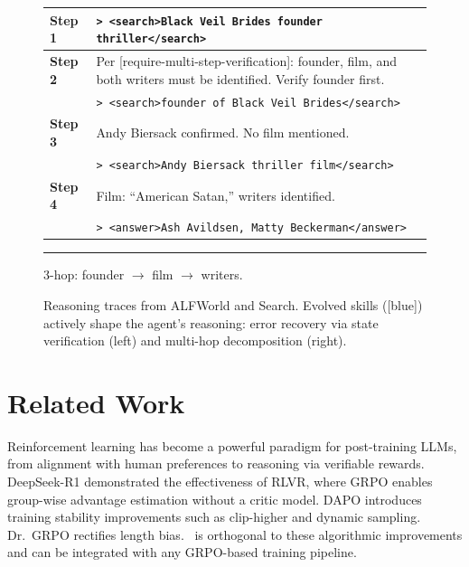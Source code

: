 \documentclass{article}
\theoremstyle{plain}
\theoremstyle{definition}
\theoremstyle{remark}
\begin{document}
\begin{figure}[!t]
\begin{minipage}[t]{0.55\textwidth}
\begin{tcolorbox}
\begin{tabularx}{\linewidth}{@{}p{0.7cm} X@{}}
    \textbf{Step 1} & \textcolor{black!55}{\texttt{> <search>Black Veil Brides founder thriller</search>}} \\
    \midrule
    \textbf{Step 2} & Per [\textcolor{skillcolor}{require-multi-step-verification}]: founder, film, and both writers must be identified. Verify founder first. \\
    & \textcolor{black!55}{\texttt{> <search>founder of Black Veil Brides</search>}} \\
    \midrule
    \textbf{Step 3} & Andy Biersack confirmed. No film mentioned. \\
    & \textcolor{black!55}{\texttt{> <search>Andy Biersack thriller film</search>}} \\
    \midrule
    \textbf{Step 4} & Film: ``American Satan,'' writers identified. \\
    & \textcolor{black!55}{\texttt{> <answer>Ash Avildsen, Matty Beckerman</answer>}} \\
\end{tabularx}

\vspace{2pt}\hrule\vspace{2pt}
\textbf{\textcolor{successgreen}{\scriptsize\checkmark}} {\scriptsize 3-hop: founder $\to$ film $\to$ writers.}
\end{tcolorbox}
\end{minipage}
\caption{Reasoning traces from ALFWorld and Search. Evolved skills ([\textcolor{skillcolor}{blue}]) actively shape the agent's reasoning: error recovery via state verification (left) and multi-hop decomposition (right).}
\label{fig:case_studies}
\end{figure}

\section{Related Work}
\label{sec:related}

Reinforcement learning has become a powerful paradigm for post-training LLMs, from alignment with human preferences \citep{ouyang2022training, rafailov2023direct} to reasoning via verifiable rewards. DeepSeek-R1 \citep{guo2025deepseek} demonstrated the effectiveness of RLVR, where GRPO \citep{shao2024deepseekmath} enables group-wise advantage estimation without a critic model. DAPO \citep{yu2025dapo} introduces training stability improvements such as clip-higher and dynamic sampling. Dr.~GRPO \citep{liu2025understanding} rectifies length bias. \ours~is orthogonal to these algorithmic improvements and can be integrated with any GRPO-based training pipeline.
\end{document}
